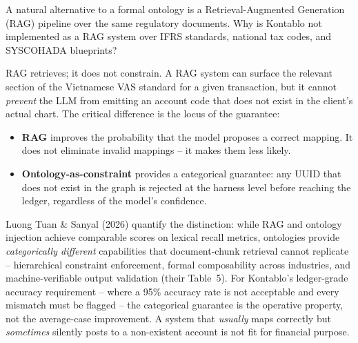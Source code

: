 A natural alternative to a formal ontology is a Retrieval-Augmented
Generation (RAG) pipeline over the same regulatory documents. Why is
Kontablo not implemented as a RAG system over IFRS standards, national tax
codes, and SYSCOHADA blueprints?

RAG retrieves; it does not constrain. A RAG system can surface the relevant
section of the Vietnamese VAS standard for a given transaction, but it
cannot \emph{prevent} the LLM from emitting an account code that does not
exist in the client's actual chart. The critical difference is the locus of
the guarantee:

\begin{itemize}
  \item \textbf{RAG} improves the probability that the model proposes a
  correct mapping. It does not eliminate invalid mappings -- it makes them
  less likely.
  \item \textbf{Ontology-as-constraint} provides a categorical guarantee:
  any UUID that does not exist in the graph is rejected at the harness level
  before reaching the ledger, regardless of the model's confidence.
\end{itemize}

Luong Tuan \& Sanyal (2026) quantify the distinction: while RAG and ontology
injection achieve comparable scores on lexical recall metrics, ontologies
provide \emph{categorically different} capabilities that document-chunk
retrieval cannot replicate -- hierarchical constraint enforcement, formal
composability across industries, and machine-verifiable output validation
(their Table~5). For Kontablo's ledger-grade accuracy requirement -- where a
95\% accuracy rate is not acceptable and every mismatch must be flagged --
the categorical guarantee is the operative property, not the average-case
improvement. A system that \emph{usually} maps correctly but \emph{sometimes}
silently posts to a non-existent account is not fit for financial purpose.
